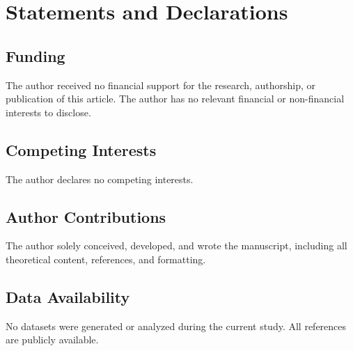 \documentclass[entropy,article,submit,pdftex,moreauthors]{Definitions/mdpi}
\begin{document}

\section*{Statements and Declarations}
\subsection*{Funding}  
The author received no financial support for the research, authorship, or publication of this article.
The author has no relevant financial or non-financial interests to disclose.

\subsection*{Competing Interests}  
The author declares no competing interests.

\subsection*{Author Contributions}  
The author solely conceived, developed, and wrote the manuscript, including all theoretical content, references, and formatting.

\subsection*{Data Availability}  
No datasets were generated or analyzed during the current study. All references are publicly available.
\end{document}
